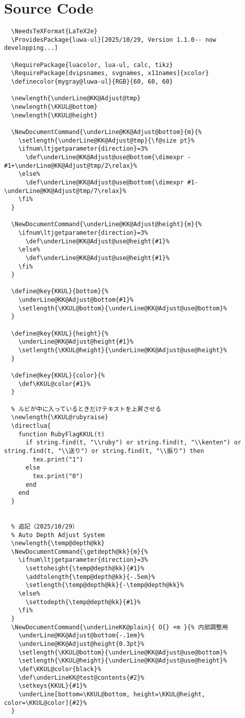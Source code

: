 \documentclass[luatex,fontsize=8pt,paper=b5,twoside]{jlreq}%
\begin{document}
\section{Source Code}
\begin{lstlisting}
  \NeedsTeXFormat{LaTeX2e}
  \ProvidesPackage{luwa-ul}[2025/10/29, Version 1.1.0-- now developping...]

  \RequirePackage{luacolor, lua-ul, calc, tikz}
  \RequirePackage[dvipsnames, svgnames, x11names]{xcolor}
  \definecolor{mygray@luwa-ul}{RGB}{60, 60, 60}

  \newlength{\underLine@KK@Adjust@tmp}
  \newlength{\KKUL@bottom}
  \newlength{\KKUL@height}

  \NewDocumentCommand{\underLine@KK@Adjust@bottom}{m}{%
    \setlength{\underLine@KK@Adjust@tmp}{\f@size pt}%
    \ifnum\ltjgetparameter{direction}=3%
      \def\underLine@KK@Adjust@use@bottom{\dimexpr -#1+\underLine@KK@Adjust@tmp/2\relax}%
    \else%
      \def\underLine@KK@Adjust@use@bottom{\dimexpr #1-\underLine@KK@Adjust@tmp/7\relax}%
    \fi%
  }

  \NewDocumentCommand{\underLine@KK@Adjust@height}{m}{%
    \ifnum\ltjgetparameter{direction}=3%
      \def\underLine@KK@Adjust@use@height{#1}%
    \else%
      \def\underLine@KK@Adjust@use@height{#1}%
    \fi%
  }

  \define@key{KKUL}{bottom}{%
    \underLine@KK@Adjust@bottom{#1}%
    \setlength{\KKUL@bottom}{\underLine@KK@Adjust@use@bottom}%
  }

  \define@key{KKUL}{height}{%
    \underLine@KK@Adjust@height{#1}%
    \setlength{\KKUL@height}{\underLine@KK@Adjust@use@height}%
  }

  \define@key{KKUL}{color}{%
    \def\KKUL@color{#1}%
  }

  % ルビが中に入っているときだけテキストを上昇させる
  \newlength{\KKUL@rubyraise}
  \directlua{
    function RubyFlagKKUL(t)
      if string.find(t, "\\ruby") or string.find(t, "\\kenten") or string.find(t, "\\送り") or string.find(t, "\\振り") then
        tex.print("1")
      else
        tex.print("0")
      end
    end
  }


  % 追記（2025/10/29）
  % Auto Depth Adjust System 
  \newlength{\temp@depth@kk}
  \NewDocumentCommand{\getdepth@kk}{m}{%
    \ifnum\ltjgetparameter{direction}=3%
      \settoheight{\temp@depth@kk}{#1}%
      \addtolength{\temp@depth@kk}{-.5em}%
      \setlength{\temp@depth@kk}{-\temp@depth@kk}%
    \else%
      \settodepth{\temp@depth@kk}{#1}%
    \fi%
  }
  \NewDocumentCommand{\underLineKK@plain}{ O{} +m }{% 内部調整用
    \underLine@KK@Adjust@bottom{-.1em}%
    \underLine@KK@Adjust@height{0.3pt}%
    \setlength{\KKUL@bottom}{\underLine@KK@Adjust@use@bottom}%
    \setlength{\KKUL@height}{\underLine@KK@Adjust@use@height}%
    \def\KKUL@color{black}%
    \def\underLineKK@test@contents{#2}%
    \setkeys{KKUL}{#1}%
    \underLine[bottom=\KKUL@bottom, height=\KKUL@height, color=\KKUL@color]{#2}%
  }


\end{lstlisting}
\end{document}

